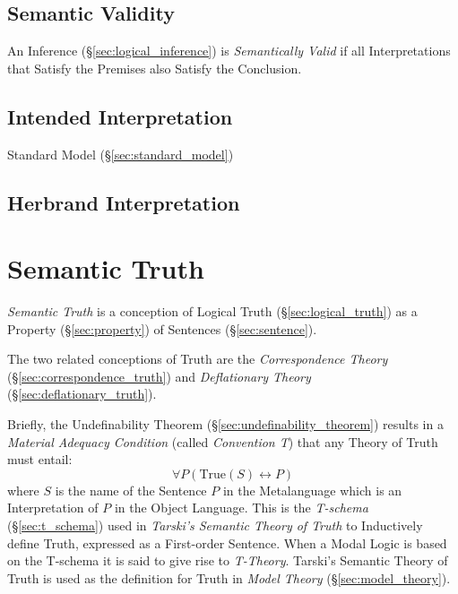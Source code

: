 \subsection{Semantic Validity}\label{sec:semantic_validity}

An Inference (\S\ref{sec:logical_inference}) is \emph{Semantically
  Valid} if all Interpretations that Satisfy the Premises also Satisfy
the Conclusion. \cite{gamut91}



\subsection{Intended Interpretation}\label{sec:intended_interpretation}

Standard Model (\S\ref{sec:standard_model})



\subsection{Herbrand Interpretation}\label{sec:herbrand_interpretation}



\section{Semantic Truth}\label{sec:semantic_truth}

\emph{Semantic Truth} is a conception of Logical Truth
(\S\ref{sec:logical_truth}) as a Property (\S\ref{sec:property}) of
Sentences (\S\ref{sec:sentence}).

The two related conceptions of Truth are the \emph{Correspondence
  Theory} (\S\ref{sec:correspondence_truth}) and \emph{Deflationary
  Theory} (\S\ref{sec:deflationary_truth}).

Briefly, the Undefinability Theorem
(\S\ref{sec:undefinability_theorem}) results in a \emph{Material
  Adequacy Condition} (called \emph{Convention T}) that any Theory of
Truth must entail:
\[
    \forall P (\mathrm{True}(S) \leftrightarrow P)
\]
where $S$ is the name of the Sentence $P$ in the Metalanguage which is
an Interpretation of $P$ in the Object Language. This is the
\emph{T-schema} (\S\ref{sec:t_schema}) used in \emph{Tarski's Semantic
  Theory of Truth} to Inductively define Truth, expressed as a
First-order Sentence. When a Modal Logic is based on the T-schema it
is said to give rise to \emph{T-Theory}. Tarski's Semantic Theory of
Truth is used as the definition for Truth in \emph{Model Theory}
(\S\ref{sec:model_theory}).

